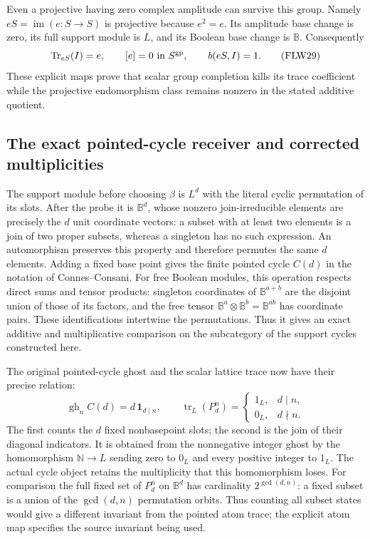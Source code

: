 Even a projective having zero complex amplitude can survive this
group. Namely $eS=\operatorname{im}(e:S\to S)$ is projective
because $e^2=e$. Its amplitude base change is zero, its full support
module is $L$, and its Boolean base change is $\mathbb B$.
Consequently
\[
 \operatorname{Tr}_{eS}(I)=e,\qquad
 [e]=0\text{ in }S^{\rm gp},\qquad b(eS,I)=1.
 \tag{FLW29}
\]
These explicit maps prove that scalar group completion kills its
trace coefficient while the projective endomorphism class remains
nonzero in the stated additive quotient.

\subsection{The exact pointed-cycle receiver and corrected multiplicities}

The support module before choosing $\beta$ is $L^d$ with the literal
cyclic permutation of its slots. After the probe it is $\mathbb B^d$,
whose nonzero join-irreducible elements are precisely the $d$ unit
coordinate vectors: a subset with at least two elements is a join
of two proper subsets, whereas a singleton has no such expression.
An automorphism preserves this property and therefore permutes the
same $d$ elements. Adding a fixed base point gives the finite pointed
cycle $C(d)$ in the notation of Connes--Consani.
For free Boolean modules, this operation respects direct sums and
tensor products: singleton coordinates of $\mathbb B^{a+b}$ are
the disjoint union of those of its factors, and the free tensor
$\mathbb B^a\otimes\mathbb B^b=\mathbb B^{ab}$ has coordinate
pairs. These identifications intertwine the permutations.
Thus it gives an exact additive and multiplicative comparison on
the subcategory of the support cycles constructed here.

The original pointed-cycle ghost and the scalar lattice trace now
have their precise relation:
\[
 \operatorname{gh}_n C(d)=d\,\mathbf1_{d\mid n},\qquad
 \operatorname{tr}_{L}(P_d^n)=
       \begin{cases}1_L,&d\mid n,\\0_L,&d\nmid n.
       \end{cases}
 \tag{FLW30}
\]
The first counts the $d$ fixed nonbasepoint slots; the second is
the join of their diagonal indicators. It is obtained from the
nonnegative integer ghost by the homomorphism
$\mathbb N\to L$ sending zero to $0_L$ and every positive integer
to $1_L$. The actual cycle object retains the multiplicity that
this homomorphism loses. For comparison the full fixed set of
$P_d^n$ on $\mathbb B^d$ has cardinality
$2^{\gcd(d,n)}$: a fixed subset is a union of the
$\gcd(d,n)$ permutation orbits. Thus counting all subset states
would give a different invariant from the pointed atom trace;
the explicit atom map specifies the source invariant being used.


